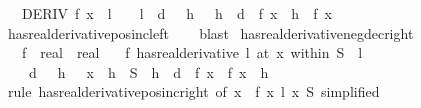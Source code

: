 \begin{isabellebody}
\ \ \ {\isachardoublequoteopen}DERIV\ f\ x\ {\isacharcolon}{\kern0pt}{\isachargreater}{\kern0pt}\ l\ {\isasymLongrightarrow}\ {}\ {\isacharless}{\kern0pt}\ l\ {\isasymLongrightarrow}\ {\isasymexists}d\ {\isachargreater}{\kern0pt}\ {}{\isachardot}{\kern0pt}\ {\isasymforall}h\ {\isachargreater}{\kern0pt}\ {}{\isachardot}{\kern0pt}\ h\ {\isacharless}{\kern0pt}\ d\ {\isasymlongrightarrow}\ f\ {\isacharparenleft}{\kern0pt}x\ {\isacharminus}{\kern0pt}\ h{\isacharparenright}{\kern0pt}\ {\isacharless}{\kern0pt}\ f\ x{\isachardoublequoteclose}\isanewline
%
\isadelimproof
\ \ %
\endisadelimproof
%
\isatagproof
{}\isamarkupfalse%
\ has{\isacharunderscore}{\kern0pt}real{\isacharunderscore}{\kern0pt}derivative{\isacharunderscore}{\kern0pt}pos{\isacharunderscore}{\kern0pt}inc{\isacharunderscore}{\kern0pt}left\isanewline
\ \ \isamarkupfalse%
\ blast%
\endisatagproof
{\isafoldproof}%
%
\isadelimproof
\isanewline
%
\endisadelimproof
\isanewline
{}\isamarkupfalse%
\ has{\isacharunderscore}{\kern0pt}real{\isacharunderscore}{\kern0pt}derivative{\isacharunderscore}{\kern0pt}neg{\isacharunderscore}{\kern0pt}dec{\isacharunderscore}{\kern0pt}right{\isacharcolon}{\kern0pt}\isanewline
\ \ \ f\ {\isacharcolon}{\kern0pt}{\isacharcolon}{\kern0pt}\ {\isachardoublequoteopen}real\ {\isasymRightarrow}\ real{\isachardoublequoteclose}\isanewline
\ \ \ {\isachardoublequoteopen}{\isacharparenleft}{\kern0pt}f\ has{\isacharunderscore}{\kern0pt}real{\isacharunderscore}{\kern0pt}derivative\ l{\isacharparenright}{\kern0pt}\ {\isacharparenleft}{\kern0pt}at\ x\ within\ S{\isacharparenright}{\kern0pt}\ {\isasymLongrightarrow}\ l\ {\isacharless}{\kern0pt}\ {}\ {\isasymLongrightarrow}\isanewline
\ \ \ \ {\isasymexists}d\ {\isachargreater}{\kern0pt}\ {}{\isachardot}{\kern0pt}\ {\isasymforall}h\ {\isachargreater}{\kern0pt}\ {}{\isachardot}{\kern0pt}\ x\ {\isacharplus}{\kern0pt}\ h\ {\isasymin}\ S\ {\isasymlongrightarrow}\ h\ {\isacharless}{\kern0pt}\ d\ {\isasymlongrightarrow}\ f\ x\ {\isachargreater}{\kern0pt}\ f\ {\isacharparenleft}{\kern0pt}x\ {\isacharplus}{\kern0pt}\ h{\isacharparenright}{\kern0pt}{\isachardoublequoteclose}\isanewline
%
\isadelimproof
\ \ %
\endisadelimproof
%
\isatagproof
{}\isamarkupfalse%
\ {\isacharparenleft}{\kern0pt}rule\ has{\isacharunderscore}{\kern0pt}real{\isacharunderscore}{\kern0pt}derivative{\isacharunderscore}{\kern0pt}pos{\isacharunderscore}{\kern0pt}inc{\isacharunderscore}{\kern0pt}right\ {\isacharbrackleft}{\kern0pt}of\ {\isachardoublequoteopen}{\isasymlambda}x{\isachardot}{\kern0pt}\ {\isacharminus}{\kern0pt}\ f\ x{\isachardoublequoteclose}\ {\isachardoublequoteopen}{\isacharminus}{\kern0pt}l{\isachardoublequoteclose}\ x\ S{\isacharcomma}{\kern0pt}\ simplified{\isacharbrackright}{\kern0pt}{\isacharparenright}{\kern0pt}\isanewline

\end{isabellebody}
